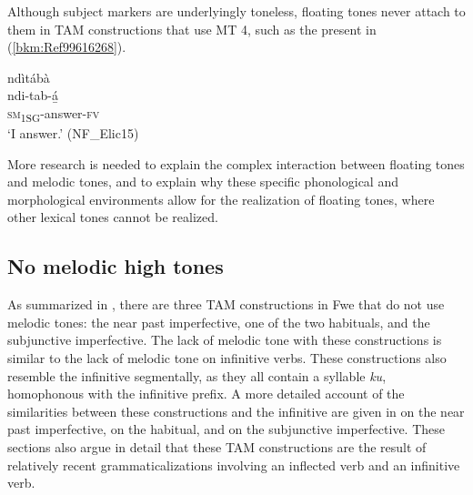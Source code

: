 Although subject markers are underlyingly toneless, floating tones never attach to them in TAM constructions that use MT 4, such as the present in (\ref{bkm:Ref99616268}).

\ea
\label{bkm:Ref99616268}
\glll ndìtábà\\
ndi-tab-á̲\\
\textsc{sm}\textsubscript{1SG}-answer-\textsc{fv}\\
\glt ‘I answer.’ (NF\_Elic15)
\z

More research is needed to explain the complex interaction between floating tones and melodic tones, and to explain why these specific phonological and morphological environments allow for the realization of floating tones, where other lexical tones cannot be realized.

\subsection{No melodic high tones}
\label{bkm:Ref71540393}\hypertarget{Toc75352633}{}
As summarized in , there are three TAM constructions in Fwe that do not use melodic tones: the near past imperfective, one of the two habituals, and the subjunctive imperfective. The lack of melodic tone with these constructions is similar to the lack of melodic tone on infinitive verbs. These constructions also resemble the infinitive segmentally, as they all contain a syllable \textit{ku}, homophonous with the infinitive prefix. A more detailed account of the similarities between these constructions and the infinitive are given in  on the near past imperfective,  on the habitual, and  on the subjunctive imperfective. These sections also argue in detail that these TAM constructions are the result of relatively recent grammaticalizations involving an inflected verb and an infinitive verb.

